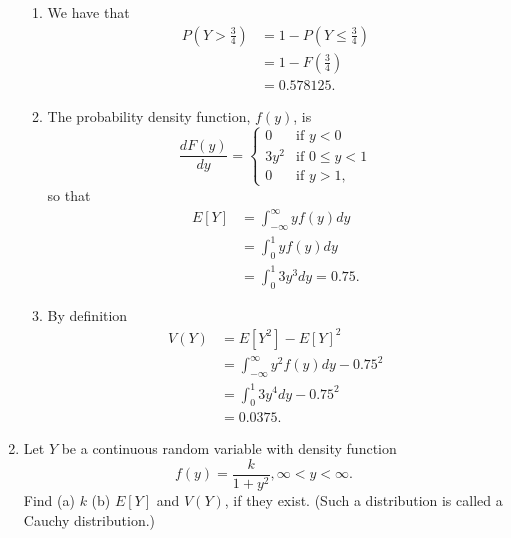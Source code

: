 \documentclass[9pt]{article}
\begin{document}
\begin{enumerate}
      \begin{enumerate}
         \item We have that
               \begin{align*}
                  P\left(Y > \frac{3}{4}\right) &=
                     1 - P\left(Y \le \frac{3}{4}\right) \\
                     &= 1 - F\left(\frac{3}{4}\right) \\
                     &= 0.578125.
               \end{align*}
         \item The probability density function, $f(y)$, is
               \begin{equation*}
                  \frac{dF(y)}{dy} = \begin{cases}
                     0   & \text{if } y < 0 \\
                     3y^2 & \text{if } 0 \le y < 1 \\
                     0   & \text{if } y > 1,
                  \end{cases}
               \end{equation*}
               so that
               \begin{align*}
                  E[Y] &= \int_{-\infty}^{\infty} y f(y) dy \\
                     &= \int_0^1 y f(y) dy \\
                     &= \int_0^1 3y^3 dy = 0.75.
               \end{align*}
         \item By definition
               \begin{align*}
                  V(Y) &= E[Y^2] - E[Y]^2 \\
                     &= \int_{-\infty}^{\infty} y^2f(y) dy - 0.75^2 \\
                     &= \int_0^1 3y^4 dy - 0.75^2 \\
                     &= 0.0375.
               \end{align*}               
      \end{enumerate}
   \item Let $Y$ be a continuous random variable with density function
         $$f(y) = \frac{k}{1 + y^2}, \infty < y < \infty.$$
         Find (a) $k$ \qquad (b) $E[Y]$ \qquad and $V(Y)$, if they exist. (Such 
         a distribution is called a Cauchy distribution.)


\end{enumerate}
\end{document}
